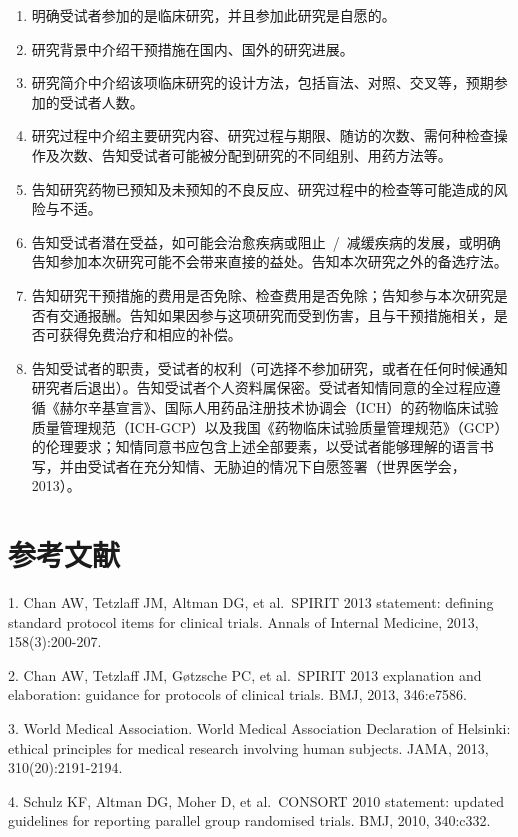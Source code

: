 \documentclass[
  chinese-hans,
  letterpaper,
  DIV=11,
  numbers=noendperiod]{scrreprt}
\begin{document}
\begin{enumerate}
\def\labelenumi{\arabic{enumi}.}
\item
  明确受试者参加的是临床研究，并且参加此研究是自愿的。
\item
  研究背景中介绍干预措施在国内、国外的研究进展。
\item
  研究简介中介绍该项临床研究的设计方法，包括盲法、对照、交叉等，预期参加的受试者人数。
\item
  研究过程中介绍主要研究内容、研究过程与期限、随访的次数、需何种检查操作及次数、告知受试者可能被分配到研究的不同组别、用药方法等。
\item
  告知研究药物已预知及未预知的不良反应、研究过程中的检查等可能造成的风险与不适。
\item
  告知受试者潜在受益，如可能会治愈疾病或阻止~/~减缓疾病的发展，或明确告知参加本次研究可能不会带来直接的益处。告知本次研究之外的备选疗法。
\item
  告知研究干预措施的费用是否免除、检查费用是否免除；告知参与本次研究是否有交通报酬。告知如果因参与这项研究而受到伤害，且与干预措施相关，是否可获得免费治疗和相应的补偿。
\item
  告知受试者的职责，受试者的权利（可选择不参加研究，或者在任何时候通知研究者后退出）。告知受试者个人资料属保密。受试者知情同意的全过程应遵循《赫尔辛基宣言》、国际人用药品注册技术协调会（ICH）的药物临床试验质量管理规范（ICH-GCP）以及我国《药物临床试验质量管理规范》（GCP）的伦理要求；知情同意书应包含上述全部要素，以受试者能够理解的语言书写，并由受试者在充分知情、无胁迫的情况下自愿签署（世界医学会，2013）。
\end{enumerate}

\section{参考文献}\label{ux53c2ux8003ux6587ux732e-3}

1. Chan AW, Tetzlaff JM, Altman DG, et al.~SPIRIT 2013 statement:
defining standard protocol items for clinical trials. Annals of Internal
Medicine, 2013, 158(3):200-207.

2. Chan AW, Tetzlaff JM, Gøtzsche PC, et al.~SPIRIT 2013 explanation and
elaboration: guidance for protocols of clinical trials. BMJ, 2013,
346:e7586.

3. World Medical Association. World Medical Association Declaration of
Helsinki: ethical principles for medical research involving human
subjects. JAMA, 2013, 310(20):2191-2194.

4. Schulz KF, Altman DG, Moher D, et al.~CONSORT 2010 statement: updated
guidelines for reporting parallel group randomised trials. BMJ, 2010,
340:c332.
\end{document}

